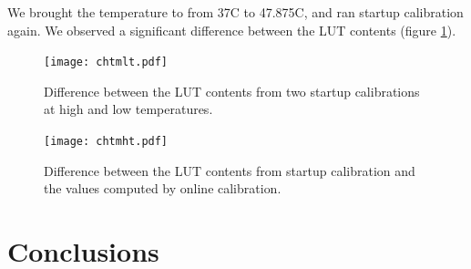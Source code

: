 \documentclass[a4paper,11pt]{article}
\begin{document}
We brought the temperature to from 37\degree C to 47.875\degree C, and ran startup calibration again. We observed a significant difference between the LUT contents (figure \ref{fig:chtmlt}).

\begin{figure}[!h]
\texttt{[image: chtmlt.pdf]}
\caption{Difference between the LUT contents from two startup calibrations at high and low temperatures.}
\label{fig:chtmlt}
\end{figure}

\begin{figure}[!h]
\texttt{[image: chtmht.pdf]}
\caption{Difference between the LUT contents from startup calibration and the values computed by online calibration.}
\label{fig:chtmht}
\end{figure}

\section{Conclusions}
\end{document}
